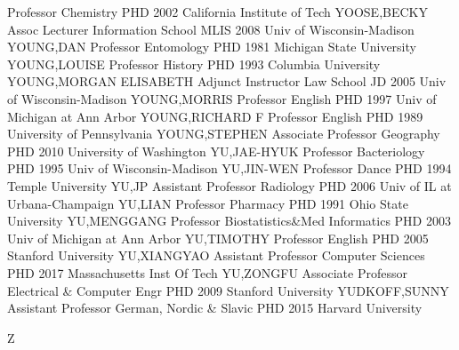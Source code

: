 \documentclass[
]{article}
\begin{document}
\textbar Professor \textbar Chemistry \textbar PHD 2002 California
Institute of Tech \textbar YOOSE,BECKY \textbar{} 
\textbar Assoc Lecturer \textbar Information School \textbar MLIS 2008
Univ of Wisconsin-Madison \textbar YOUNG,DAN \textbar{} 
\textbar Professor \textbar Entomology \textbar PHD 1981 Michigan State
University \textbar YOUNG,LOUISE \textbar{} 
\textbar Professor \textbar History \textbar PHD 1993 Columbia
University \textbar YOUNG,MORGAN ELISABETH \textbar{} 
\textbar Adjunct Instructor \textbar Law School \textbar JD 2005 Univ of
Wisconsin-Madison \textbar YOUNG,MORRIS \textbar{} 
\textbar Professor \textbar English \textbar PHD 1997 Univ of Michigan
at Ann Arbor \textbar YOUNG,RICHARD F \textbar{} 
\textbar Professor \textbar English \textbar PHD 1989 University of
Pennsylvania \textbar YOUNG,STEPHEN \textbar{} 
\textbar Associate Professor \textbar Geography \textbar PHD 2010
University of Washington \textbar YU,JAE-HYUK \textbar{} 
\textbar Professor \textbar Bacteriology \textbar PHD 1995 Univ of
Wisconsin-Madison \textbar YU,JIN-WEN \textbar{} 
\textbar Professor \textbar Dance \textbar PHD 1994 Temple University
\textbar YU,JP \textbar{}  \textbar Assistant Professor
\textbar Radiology \textbar PHD 2006 Univ of IL at Urbana-Champaign
\textbar YU,LIAN \textbar{}  \textbar Professor
\textbar Pharmacy \textbar PHD 1991 Ohio State University
\textbar YU,MENGGANG \textbar{}  \textbar Professor
\textbar Biostatistics\&Med Informatics \textbar PHD 2003 Univ of
Michigan at Ann Arbor \textbar YU,TIMOTHY \textbar{} 
\textbar Professor \textbar English \textbar PHD 2005 Stanford
University \textbar YU,XIANGYAO \textbar{} 
\textbar Assistant Professor \textbar Computer Sciences \textbar PHD
2017 Massachusetts Inst Of Tech \textbar YU,ZONGFU \textbar{}
 \textbar Associate Professor \textbar Electrical \&
Computer Engr \textbar PHD 2009 Stanford University
\textbar YUDKOFF,SUNNY \textbar{}  \textbar Assistant
Professor \textbar German, Nordic \& Slavic \textbar PHD 2015 Harvard
University \textbar{}

Z

\textbar{}  \textbar{}
\end{document}
